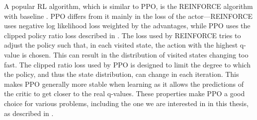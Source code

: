 A popular RL algorithm, which is similar to PPO, is the REINFORCE algorithm with baseline \cite[][Chapter 13]{sutton2018reinforcement}.
PPO differs from it mainly in the loss of the actor---REINFORCE uses negative log likelihood loss weighted by the advantages, while PPO uses the clipped policy ratio loss described in .
The loss used by REINFORCE tries to adjust the policy such that, in each visited state, the action with the highest q-value is chosen.
This can result in the distribution of visited states changing too fast.
The clipped ratio loss used by PPO is designed to limit the degree to which the policy, and thus the state distribution, can change in each iteration.
This makes PPO generally more stable when learning as it allows the predictions of the critic to get closer to the real q-values.
These properties make PPO a good choice for various problems, including the one we are interested in in this thesis, as described in .
